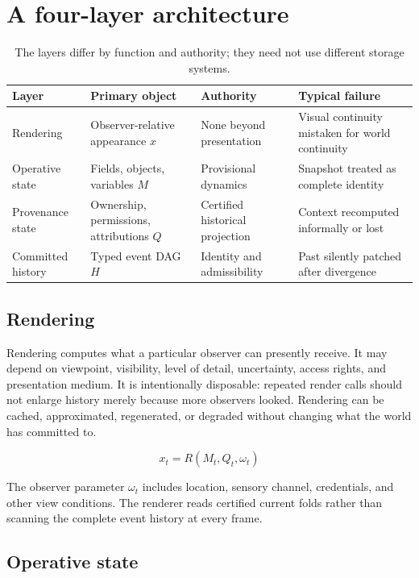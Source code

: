 \documentclass[11pt]{article}
\begin{document}
\section{A four-layer architecture}
\label{sec:architecture}

\begin{table}[h]
\centering
\begin{tabular}{p{2.3cm}p{3.0cm}p{3.0cm}p{4.5cm}}
\toprule
\textbf{Layer} & \textbf{Primary object} & \textbf{Authority} & \textbf{Typical failure} \\
\midrule
Rendering & Observer-relative appearance $x$ & None beyond presentation & Visual continuity mistaken for world continuity \\
Operative state & Fields, objects, variables $M$ & Provisional dynamics & Snapshot treated as complete identity \\
Provenance state & Ownership, permissions, attributions $Q$ & Certified historical projection & Context recomputed informally or lost \\
Committed history & Typed event DAG $H$ & Identity and admissibility & Past silently patched after divergence \\
\bottomrule
\end{tabular}
\caption{The layers differ by function and authority; they need not use different storage systems.}
\label{tab:layers}
\end{table}

\subsection{Rendering}

Rendering computes what a particular observer can presently receive. It may depend on viewpoint, visibility, level of detail, uncertainty, access rights, and presentation medium. It is intentionally disposable: repeated render calls should not enlarge history merely because more observers looked. Rendering can be cached, approximated, regenerated, or degraded without changing what the world has committed to.

\[
x_t = R(M_t, Q_t, \omega_t)
\]

The observer parameter $\omega_t$ includes location, sensory channel, credentials, and other view conditions. The renderer reads certified current folds rather than scanning the complete event history at every frame.

\subsection{Operative state}
\end{document}
